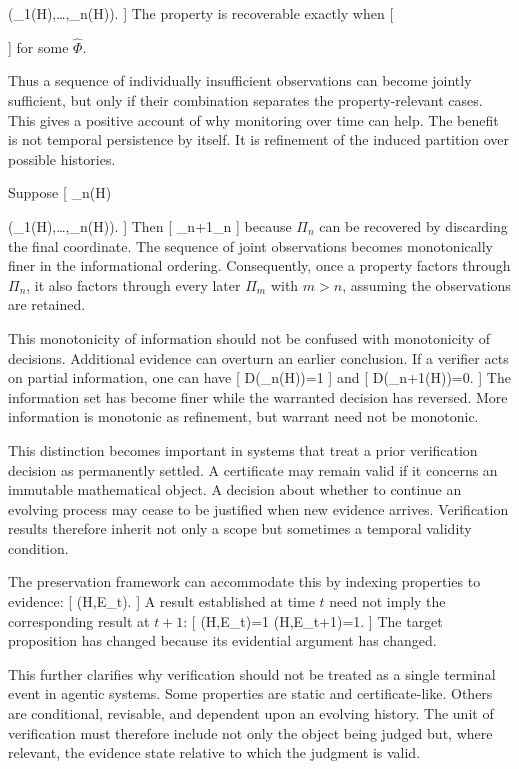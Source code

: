\documentclass[11pt]{article}
\begin{document}
(\pi_1(H),\ldots,\pi_n(H)).
]
The property is recoverable exactly when
[
\Phi

\widehat{\Phi}\circ\Pi
]
for some $\widehat{\Phi}$.

Thus a sequence of individually insufficient observations can become jointly sufficient, but only if their combination separates the property-relevant cases. This gives a positive account of why monitoring over time can help. The benefit is not temporal persistence by itself. It is refinement of the induced partition over possible histories.

Suppose
[
\Pi_n(H)

(\pi_1(H),\ldots,\pi_n(H)).
]
Then
[
\Pi_{n+1}\succeq\Pi_n
]
because $\Pi_n$ can be recovered by discarding the final coordinate. The sequence of joint observations becomes monotonically finer in the informational ordering. Consequently, once a property factors through $\Pi_n$, it also factors through every later $\Pi_m$ with $m>n$, assuming the observations are retained.

This monotonicity of information should not be confused with monotonicity of decisions. Additional evidence can overturn an earlier conclusion. If a verifier acts on partial information, one can have
[
D(\Pi_n(H))=1
]
and
[
D(\Pi_{n+1}(H))=0.
]
The information set has become finer while the warranted decision has reversed. More information is monotonic as refinement, but warrant need not be monotonic.

This distinction becomes important in systems that treat a prior verification decision as permanently settled. A certificate may remain valid if it concerns an immutable mathematical object. A decision about whether to continue an evolving process may cease to be justified when new evidence arrives. Verification results therefore inherit not only a scope but sometimes a temporal validity condition.

The preservation framework can accommodate this by indexing properties to evidence:
[
\Phi(H,E_t).
]
A result established at time $t$ need not imply the corresponding result at $t+1$:
[
\Phi(H,E_t)=1
\quad\not\Rightarrow\quad
\Phi(H,E_{t+1})=1.
]
The target proposition has changed because its evidential argument has changed.

This further clarifies why verification should not be treated as a single terminal event in agentic systems. Some properties are static and certificate-like. Others are conditional, revisable, and dependent upon an evolving history. The unit of verification must therefore include not only the object being judged but, where relevant, the evidence state relative to which the judgment is valid.
\end{document}
